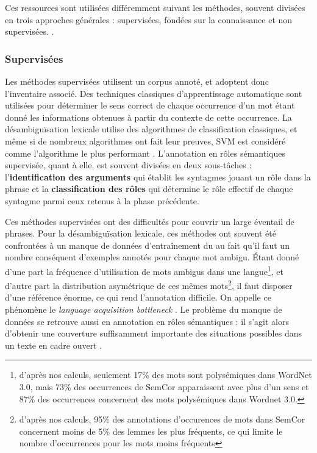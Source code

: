 Ces ressources sont utilisées différemment suivant les méthodes, souvent
divisées en trois approches générales : supervisées, fondées sur la
connaissance et non supervisées. \citep{navigli2009word}.

\subsubsection{Supervisées}

Les méthodes supervisées utilisent un corpus annoté, et adoptent donc
l'inventaire associé. Des techniques classiques d'apprentissage automatique
sont utilisées pour déterminer le sens correct de chaque occurrence d'un mot
étant donné les informations obtenues à partir du contexte de cette occurrence.
La désambiguïsation lexicale utilise des algorithmes de classification
classiques, et même si de nombreux algorithmes ont fait leur preuves, SVM est
considéré comme l'algorithme le plus performant \cite{navigli2012quick}.
L'annotation en rôles sémantiques supervisée, quant à elle, est souvent
divisées en deux sous-tâches : l'\textbf{identification des arguments} qui
établit les syntagmes jouant un rôle dans la phrase et la
\textbf{classification des rôles} qui détermine le rôle effectif de chaque
syntagme parmi ceux retenus à la phase précédente.

Ces méthodes supervisées ont des difficultés pour couvrir un large éventail de
phrases. Pour la désambiguïsation lexicale, ces méthodes ont souvent été
confrontées à un manque de données d'entraînement du au fait qu'il faut un
nombre conséquent d'exemples annotés pour chaque mot ambigu. Étant donné d'une
part la fréquence d'utilisation de mots ambigus dans une
langue\footnote{d'après nos calculs, seulement 17\% des mots sont polysémiques
    dans WordNet 3.0, mais 73\% des occurrences de SemCor apparaissent avec
    plus d'un sens et 87\% des occurrences concernent des mots polysémiques
dans Wordnet 3.0.}, et d'autre part la distribution asymétrique de ces mêmes
mots\footnote{d'après nos calculs, 95\% des annotations d'occurences de mots
    dans SemCor concernent moins de 5\% des lemmes les plus fréquents, ce qui
limite le nombre d'occurrences pour les mots moins fréquents}, il faut disposer
d'une référence énorme, ce qui rend l'annotation difficile. On appelle ce
phénomène le \textit{language acquisition bottleneck} \citep{gale1992using}. Le
problème du manque de données se retrouve aussi en annotation en rôles
sémantiques : il s'agit alors d'obtenir une couverture suffisamment importante
des situations possibles dans un texte en cadre ouvert
\cite[p.~155]{marquez2008semantic}.

